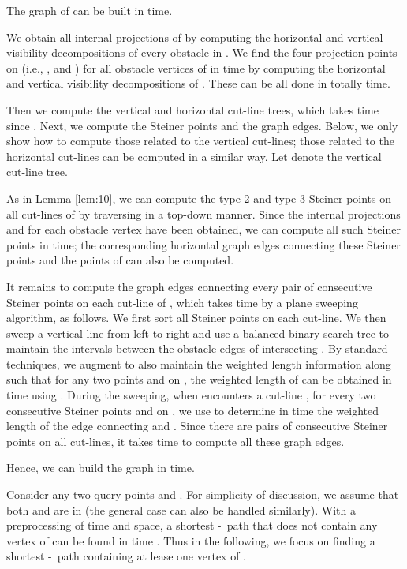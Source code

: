 \documentclass[english,runningheads,11pt]{llncs}
\def\st{-}
\newenvironment{proof}{\noindent {\textbf{Proof:}}\rm}{\hfill \rm}
\begin{document}
\begin{lemma}\label{lem:200}
The graph of  can be built in 
time.
\end{lemma}
\begin{proof}
We obtain all internal projections of  by computing the
horizontal and vertical visibility decompositions of every
obstacle in . We find the four projection points on  (i.e., ,
and ) for all obstacle vertices  of  in  time by
computing the horizontal and vertical visibility decompositions of .
These can be all done in totally  time.

Then we compute the vertical and horizontal cut-line trees, which takes
 time since . Next, we compute
the Steiner points and the graph edges. Below, we only show how to compute those
related to the vertical cut-lines; those related to the horizontal
cut-lines can be computed in a similar way.
Let  denote the vertical cut-line tree.

As in Lemma \ref{lem:10}, we can compute the type-2 and type-3 Steiner
points on all cut-lines of  by traversing  in a top-down
manner. Since the internal projections and  for
each obstacle vertex  have been obtained, we can compute all
 such Steiner points in  time; the corresponding horizontal graph
edges connecting these Steiner points and the points of  can
also be computed.


It remains to compute the graph edges connecting every pair of consecutive Steiner points
on each cut-line of , which takes  time by a
plane sweeping algorithm, as follows. We first sort all Steiner points on each cut-line.
We then sweep a vertical line  from left to
right and use a balanced binary search tree  to maintain the
intervals between the obstacle edges of  intersecting . By standard
techniques, we augment  to also maintain the weighted length
information along  such that for any two points  and  on
, the weighted length of  can
be obtained in  time using . During the sweeping,
when  encounters a cut-line , for every two consecutive Steiner
points  and  on , we use  to determine in  time the weighted
length of the edge connecting  and .
Since there are  pairs of consecutive Steiner points on all cut-lines, it takes
 time to compute all these graph edges.

Hence, we can build the graph  in  time.
\end{proof}

Consider any two query points  and . For simplicity of discussion, we assume that both  and  are
in  (the general case can also be handled similarly). With a preprocessing of 
time and space, a shortest \st\ path that does not
contain any vertex of  can be found in  time \cite{ref:ChenSh00}. Thus in the
following, we focus on finding a shortest \st\ path containing at lease one
vertex of .
\end{document}
